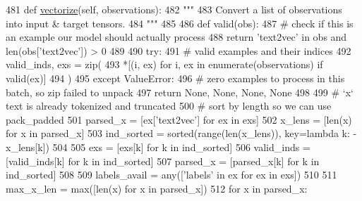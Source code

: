 \begin{DoxyCode}
481     \textcolor{keyword}{def }\hyperlink{namespaceparlai_1_1agents_1_1drqa_1_1utils_a5c76cc39e3014c7bcf9199d566dbdc0f}{vectorize}(self, observations):
482         \textcolor{stringliteral}{"""}
483 \textcolor{stringliteral}{        Convert a list of observations into input & target tensors.}
484 \textcolor{stringliteral}{        """}
485 
486         \textcolor{keyword}{def }valid(obs):
487             \textcolor{comment}{# check if this is an example our model should actually process}
488             \textcolor{keywordflow}{return} \textcolor{stringliteral}{'text2vec'} \textcolor{keywordflow}{in} obs \textcolor{keywordflow}{and} len(obs[\textcolor{stringliteral}{'text2vec'}]) > 0
489 
490         \textcolor{keywordflow}{try}:
491             \textcolor{comment}{# valid examples and their indices}
492             valid\_inds, exs = zip(
493                 *[(i, ex) \textcolor{keywordflow}{for} i, ex \textcolor{keywordflow}{in} enumerate(observations) \textcolor{keywordflow}{if} valid(ex)]
494             )
495         \textcolor{keywordflow}{except} ValueError:
496             \textcolor{comment}{# zero examples to process in this batch, so zip failed to unpack}
497             \textcolor{keywordflow}{return} \textcolor{keywordtype}{None}, \textcolor{keywordtype}{None}, \textcolor{keywordtype}{None}, \textcolor{keywordtype}{None}
498 
499         \textcolor{comment}{# `x` text is already tokenized and truncated}
500         \textcolor{comment}{# sort by length so we can use pack\_padded}
501         parsed\_x = [ex[\textcolor{stringliteral}{'text2vec'}] \textcolor{keywordflow}{for} ex \textcolor{keywordflow}{in} exs]
502         x\_lens = [len(x) \textcolor{keywordflow}{for} x \textcolor{keywordflow}{in} parsed\_x]
503         ind\_sorted = sorted(range(len(x\_lens)), key=\textcolor{keyword}{lambda} k: -x\_lens[k])
504 
505         exs = [exs[k] \textcolor{keywordflow}{for} k \textcolor{keywordflow}{in} ind\_sorted]
506         valid\_inds = [valid\_inds[k] \textcolor{keywordflow}{for} k \textcolor{keywordflow}{in} ind\_sorted]
507         parsed\_x = [parsed\_x[k] \textcolor{keywordflow}{for} k \textcolor{keywordflow}{in} ind\_sorted]
508 
509         labels\_avail = any([\textcolor{stringliteral}{'labels'} \textcolor{keywordflow}{in} ex \textcolor{keywordflow}{for} ex \textcolor{keywordflow}{in} exs])
510 
511         max\_x\_len = max([len(x) \textcolor{keywordflow}{for} x \textcolor{keywordflow}{in} parsed\_x])
512         \textcolor{keywordflow}{for} x \textcolor{keywordflow}{in} parsed\_x:

\end{DoxyCode}
